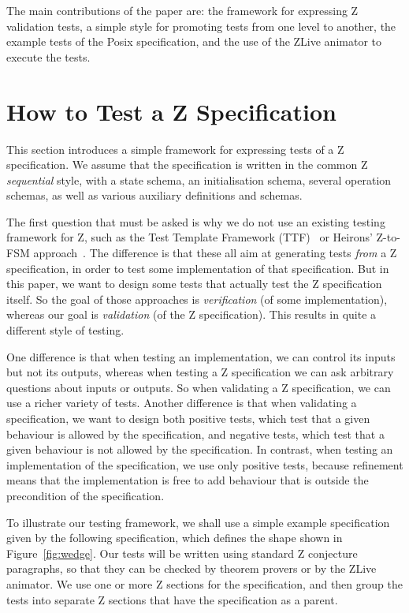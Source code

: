 \documentclass{llncs}
\begin{document}
The main contributions of the paper are: the framework for expressing
Z validation tests, a simple style for promoting tests from one level
to another, the example tests of the Posix specification, and
the use of the ZLive animator to execute the tests.


\section{How to Test a Z Specification}\label{sect:framework}

This section introduces a simple framework for expressing tests
of a Z specification.  We assume that the specification is written in the
common Z \emph{sequential} style, with a state schema, an initialisation
schema, several operation schemas, as well as various auxiliary definitions
and schemas.

The first question that must be asked is why we do not use an existing
testing framework for Z, such as the Test Template Framework
(TTF)~\cite{Stocks93,carrington94} or Heirons' Z-to-FSM
approach~\cite{hierons97}.  The difference is that these all aim at
generating tests \emph{from} a Z specification, in order to test some
implementation of that specification.  But in this paper, we want to design
some tests that actually test the Z specification itself.  So the goal of
those approaches is \emph{verification} (of some implementation), whereas
our goal is \emph{validation} (of the Z specification).  This results in
quite a different style of testing.  

One difference is that when testing an implementation, we can control its
inputs but not its outputs, whereas when testing a Z specification we can
ask arbitrary questions about inputs or outputs.  So when validating a Z
specification, we can use a richer variety of tests.  Another difference is
that when validating a specification, we want to design both positive
tests, which test that a given behaviour is allowed by the specification,
and negative tests, which test that a given behaviour is not allowed by the
specification.  In contrast, when testing an implementation of the
specification, we use only positive tests, because refinement means that
the implementation is free to add behaviour that is outside the
precondition of the specification.

To illustrate our testing framework, we shall use a simple example
specification given by the following specification, which defines
the shape shown in Figure~\ref{fig:wedge}.
Our tests will be written using standard Z conjecture paragraphs,
so that they can be checked by theorem provers or by the ZLive
animator.  We use one or more Z sections for the specification,
and then group the tests into separate Z sections that have the
specification as a parent.
\end{document}

